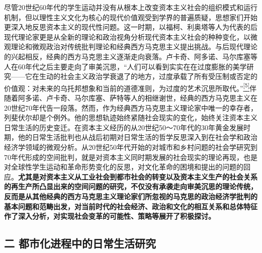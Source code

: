\documentclass[UTF8, fontset = sourcesans, a4paper, oneside, zihao =
-4, scheme=chinese, no-math, space=true]{ctexbook}
\begin{document}
尽管20世纪60年代的学生运动并没有从根本上改变资本主义社会的组织模式和运行机制，但以理性主义文化为核心的现代价值观受到学界的普遍质疑，思想家们开始更深入地反思资本主义的现代性问题。这一时期，以福柯、利奥塔等人为代表的后现代理论家更是从全新的理论和政治视角分析现代资本主义社会的种种变化，以微观理论和微观政治对传统批判理论和经典西方马克思主义提出挑战。与后现代理论的兴起相反，经典的西方马克思主义逐渐走向衰落。卢卡奇、阿多诺、马尔库塞等人在60年代之后主要走向了审美沉思，``人们可以看到实实在在过度膨胀的美学研究------它在生动的社会主义政治学衰退了的地方，过度承载了所有受压制或否定的价值观：对未来的乌托邦想象和当前的道德准则，为过度的艺术沉思所取代。''\protect\hypertarget{part0005_split_001.htmlux5cux23w5}{}{}\protect\hyperlink{part0005_split_003.htmlux5cux23m5}{\textsuperscript{{[}5{]}}}伴随着阿多诺、卢卡奇、马尔库塞、萨特等人的相继谢世，经典的西方马克思主义在20世纪70年代告一段落。然而，作为经典西方马克思主义理论家中唯一的幸存者，列斐伏尔却是个例外。他的思想轨迹始终紧随社会现实的变化，始终关注资本主义日常生活的历史变迁。在资本主义经历的从20世纪50～70年代的30年黄金发展时期，他的日常生活批判也从战后初期对日常生活的哲学反思深入到在社会学和政治经济学领域的微观分析。从20世纪50年代开始的对城市和乡村问题的社会学研究到70年代形成的空间批判，就是对资本主义同时期发展的社会现实的理论再现，也是对全球性学生运动和革命形势变化的反思，对文化革命的困境和提出的问题的回应。\textbf{尤其是对资本主义从工业社会到都市社会的转变以及资本主义生产的社会关系的再生产所凸显出来的空间问题的研究，不仅没有承袭走向审美沉思的理论传统，反而是从其他经典的西方马克思主义理论家们所忽视的马克思的政治经济学批判的基本问题和范畴出发，对当前时代的社会经济、政治和文化的相互关系和总体特征作了深入分析，对实现社会变革的可能性、策略等展开了积极探讨。}

\subsection{二
都市化进程中的日常生活研究}\label{part0005_split_001.htmlux5cux23c005}
\end{document}
